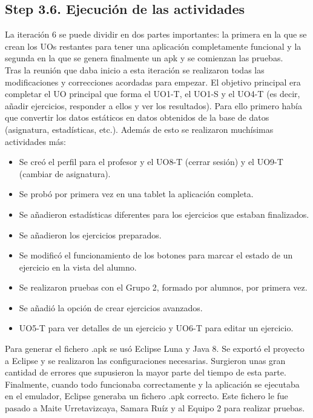 \subsection{Step 3.6. Ejecución de las actividades}
\label{it6:3.6}

La iteración 6 se puede dividir en dos partes importantes: la primera en la que se crean los UOs restantes para tener una aplicación completamente funcional y la segunda en la que se genera finalmente un apk y se comienzan las pruebas.\\

Tras la reunión que daba inicio a esta iteración se realizaron todas las modificaciones y correcciones acordadas para empezar. El objetivo principal era completar el UO principal que forma el UO1-T, el UO1-S y el UO4-T (es decir, añadir ejercicios, responder a ellos y ver los resultados). Para ello primero había que convertir los datos estáticos en datos obtenidos de la base de datos (asignatura, estadísticas, etc.). Además de esto se realizaron muchísimas actividades más:

\begin{itemize}
\item Se creó el perfil para el profesor y el UO8-T (cerrar sesión) y el UO9-T (cambiar de asignatura).
\item Se probó por primera vez en una tablet la aplicación completa.
\item Se añadieron estadísticas diferentes para los ejercicios que estaban finalizados.
\item Se añadieron los ejercicios preparados.
\item Se modificó el funcionamiento de los botones para marcar el estado de un ejercicio en la vista del alumno.
\item Se realizaron pruebas con el Grupo 2, formado por alumnos, por primera vez.
\item Se añadió la opción de crear ejercicios avanzados.
\item UO5-T para ver detalles de un ejercicio y UO6-T para editar un ejercicio.
\end{itemize}

Para generar el fichero .apk se usó Eclipse Luna y Java 8. Se exportó el proyecto a Eclipse y se realizaron las configuraciones necesarias. Surgieron unas gran cantidad de errores que supusieron la mayor parte del tiempo de esta parte. Finalmente, cuando todo funcionaba correctamente y la aplicación se ejecutaba en el emulador, Eclipse generaba un fichero .apk correcto. Este fichero le fue pasado a Maite Urretavizcaya, Samara Ruíz y al Equipo 2 para realizar pruebas.\\

